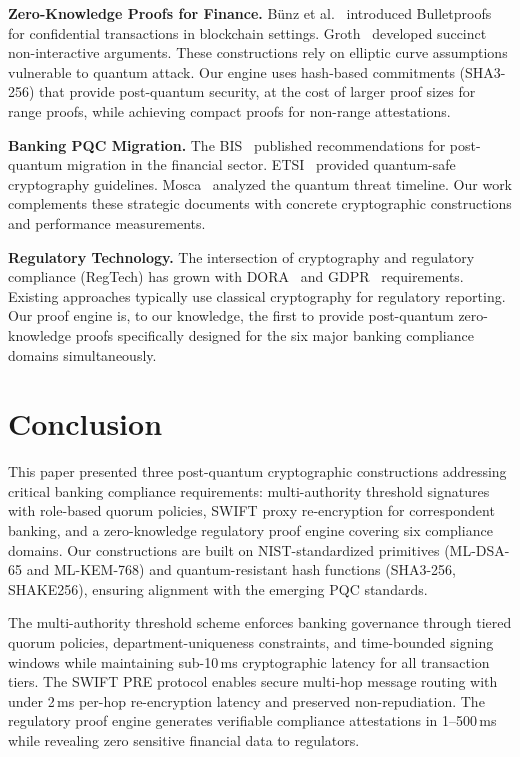 \documentclass[conference,10pt]{IEEEtran}
\begin{document}
\textbf{Zero-Knowledge Proofs for Finance.} B\"{u}nz et al.~\cite{bunz2018bulletproofs} introduced Bulletproofs for confidential transactions in blockchain settings. Groth~\cite{groth2016size} developed succinct non-interactive arguments. These constructions rely on elliptic curve assumptions vulnerable to quantum attack. Our engine uses hash-based commitments (SHA3-256) that provide post-quantum security, at the cost of larger proof sizes for range proofs, while achieving compact proofs for non-range attestations.

\textbf{Banking PQC Migration.} The BIS~\cite{bis2024pqc} published recommendations for post-quantum migration in the financial sector. ETSI~\cite{campagna2020quantum} provided quantum-safe cryptography guidelines. Mosca~\cite{mosca2018cybersecurity} analyzed the quantum threat timeline. Our work complements these strategic documents with concrete cryptographic constructions and performance measurements.

\textbf{Regulatory Technology.} The intersection of cryptography and regulatory compliance (RegTech) has grown with DORA~\cite{dora2022,esma2024dora} and GDPR~\cite{gdpr2016} requirements. Existing approaches typically use classical cryptography for regulatory reporting. Our proof engine is, to our knowledge, the first to provide post-quantum zero-knowledge proofs specifically designed for the six major banking compliance domains simultaneously.

\section{Conclusion}

This paper presented three post-quantum cryptographic constructions addressing critical banking compliance requirements: multi-authority threshold signatures with role-based quorum policies, SWIFT proxy re-encryption for correspondent banking, and a zero-knowledge regulatory proof engine covering six compliance domains. Our constructions are built on NIST-standardized primitives (ML-DSA-65 and ML-KEM-768) and quantum-resistant hash functions (SHA3-256, SHAKE256), ensuring alignment with the emerging PQC standards.

The multi-authority threshold scheme enforces banking governance through tiered quorum policies, department-uniqueness constraints, and time-bounded signing windows while maintaining sub-10\,ms cryptographic latency for all transaction tiers. The SWIFT PRE protocol enables secure multi-hop message routing with under 2\,ms per-hop re-encryption latency and preserved non-repudiation. The regulatory proof engine generates verifiable compliance attestations in 1--500\,ms while revealing zero sensitive financial data to regulators.
\end{document}
